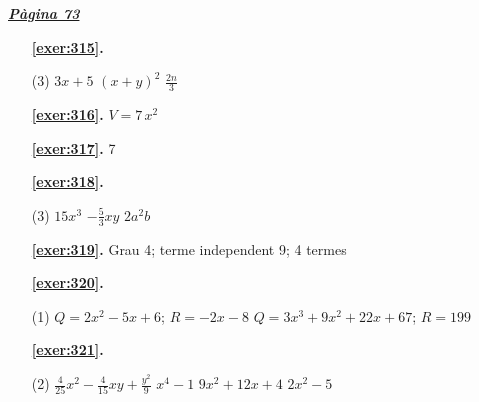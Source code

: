 \hyperlink{page.73}{\textbf{\em Pàgina 73}}
\begin{enumerate}



 \item[\fontfamily{phv}\selectfont\color{blue}\textbf{\ref{exer:315}. }] \label{ans:315}
 \begin{tasks}[column-sep=1em, item-indent=1.3333em](3)
	 \task $3x+5$
	 \task $(x+y)^2$
	 \task $\frac {2n}{3}$
\end{tasks}
 \end{enumerate}
\begin{enumerate}
\item[\fontfamily{phv}\selectfont\color{blue}\textbf{\ref{exer:316}. }] \label{ans:316} 
$V=7\,x^2$
\item[\fontfamily{phv}\selectfont\color{blue}\textbf{\ref{exer:317}. }] \label{ans:317} 
7



 \item[\fontfamily{phv}\selectfont\color{blue}\textbf{\ref{exer:318}. }] \label{ans:318}
 \begin{tasks}[column-sep=1em, item-indent=1.3333em](3)
	 \task $15x^3$
	 \task $-\frac {5}{3}xy$
	 \task $2a^2 b$
\end{tasks}
\item[\fontfamily{phv}\selectfont\color{blue}\textbf{\ref{exer:319}. }] \label{ans:319} 
Grau 4; terme independent 9; 4 termes



 \item[\fontfamily{phv}\selectfont\color{blue}\textbf{\ref{exer:320}. }] \label{ans:320}
 \begin{tasks}[column-sep=1em, item-indent=1.3333em](1)
	 \task $Q=2x^2-5x+6$; $R=-2x-8$
	 \task $Q=3x^3+9x^2+22x+67$; $R=199$
\end{tasks}



 \item[\fontfamily{phv}\selectfont\color{blue}\textbf{\ref{exer:321}. }] \label{ans:321}
 \begin{tasks}[column-sep=1em, item-indent=1.3333em](2)
	 \task* $\frac {4}{25}x^2 - \frac {4}{15}xy + \frac {y^2}{9}$
	 \task $x^4 - 1$
	 \task $9x^2+12x+4$
	 \task $2x^2 -5$
\end{tasks}



\end{enumerate}

